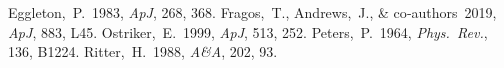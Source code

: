 \documentclass[11pt]{article}
\begin{document}

\begin{thebibliography}{}
  Eggleton,~P.\ 1983, \emph{ApJ}, 268, 368.
  Fragos,~T., Andrews,~J., \& co‑authors 2019, \emph{ApJ}, 883, L45.
  Ostriker,~E.\ 1999, \emph{ApJ}, 513, 252.
  Peters,~P.\ 1964, \emph{Phys.\ Rev.}, 136, B1224.
  Ritter,~H.\ 1988, \emph{A\&A}, 202, 93.
\end{thebibliography}
\end{document}
